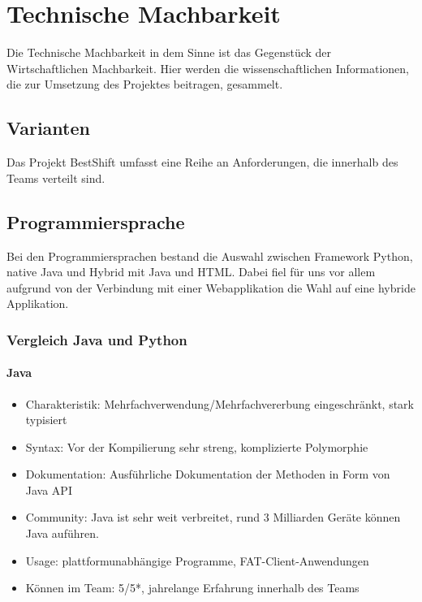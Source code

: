 \chapter {Technische Machbarkeit}
Die Technische Machbarkeit in dem Sinne ist das Gegenstück der Wirtschaftlichen Machbarkeit.
Hier werden die wissenschaftlichen Informationen, die zur Umsetzung des Projektes beitragen,
gesammelt. 

\section {Varianten}
Das Projekt BestShift umfasst eine Reihe an Anforderungen, die innerhalb des Teams verteilt sind.

\section{Programmiersprache}
Bei den Programmiersprachen bestand die Auswahl zwischen Framework Python, 
native Java und Hybrid mit Java und HTML.
Dabei fiel für uns vor allem aufgrund von der Verbindung mit einer Webapplikation die Wahl auf eine hybride Applikation. 

\newpage
\subsection{Vergleich Java und Python}
\subsubsection{Java}
\begin{itemize}
\item Charakteristik: Mehrfachverwendung/Mehrfachvererbung eingeschränkt, stark typisiert
\item Syntax: Vor der Kompilierung sehr streng, komplizierte Polymorphie
\item Dokumentation: Ausführliche Dokumentation der Methoden in Form von Java API
\item Community: Java ist sehr weit verbreitet, rund 3 Milliarden Geräte können Java auführen.
\item Usage: plattformunabhängige Programme, FAT-Client-Anwendungen
\item Können im Team: 5/5*, jahrelange Erfahrung innerhalb des Teams
\end{itemize}

